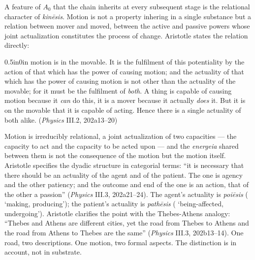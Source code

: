 A feature of $A_0$ that the chain inherits at every subsequent stage is the relational character of \textit{kinēsis}. Motion is not a property inhering in a single substance but a relation between mover and moved, between the active and passive powers whose joint actualization constitutes the process of change. Aristotle states the relation directly:
\begin{adjustwidth}{0.5in}{0in}
motion is in the movable. It is the fulfilment of this potentiality by the action of that which has the power of causing motion; and the actuality of that which has the power of causing motion is not other than the actuality of the movable; for it must be the fulfilment of \textit{both}. A thing is capable of causing motion because it \textit{can} do this, it is a mover because it actually \textit{does} it. But it is on the movable that it is capable of acting. Hence there is a single actuality of both alike. (\textit{Physics} III.2, 202a13--20)
\end{adjustwidth}
Motion is irreducibly relational, a joint actualization of two capacities --- the capacity to act and the capacity to be acted upon --- and the \textit{energeia} shared between them is not the consequence of the motion but the motion itself. Aristotle specifies the dyadic structure in categorial terms: ``it is necessary that there should be an actuality of the agent and of the patient. The one is agency and the other patiency; and the outcome and end of the one is an action, that of the other a passion'' (\textit{Physics} III.3, 202a21--24). The agent's actuality is \textit{poiēsis} ( `making, producing'); the patient's actuality is \textit{pathēsis} ( `being-affected, undergoing'). Aristotle clarifies the point with the Thebes-Athens analogy: ``Thebes and Athens are different cities, yet the road from Thebes to Athens and the road from Athens to Thebes are the same'' (\textit{Physics} III.3, 202b13--14). One road, two descriptions. One motion, two formal aspects. The distinction is in account, not in substrate.

